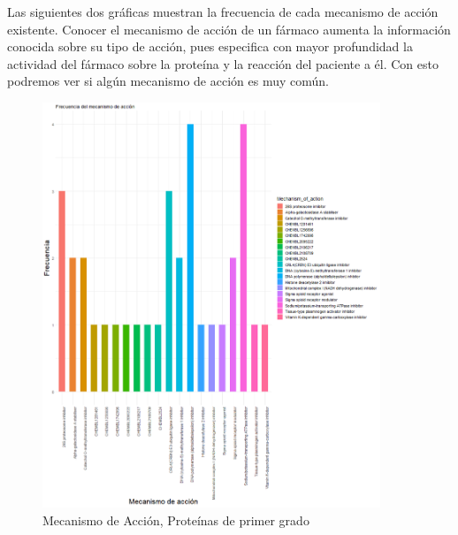 Las siguientes dos gráficas muestran la frecuencia de cada mecanismo de acción existente. Conocer el mecanismo de acción de un fármaco aumenta la información conocida sobre su tipo de acción, pues especifica con mayor profundidad la actividad del fármaco sobre la proteína y la reacción del paciente a él. Con esto podremos ver si algún mecanismo de acción es muy común.


\begin{figure}[h!]
			\includegraphics[width=0.9\textwidth]{figures/graficaMecanismoDeAccionProteinas1.png}
			\caption{Mecanismo de Acción, Proteínas de primer grado}
\end{figure}
\clearpage
